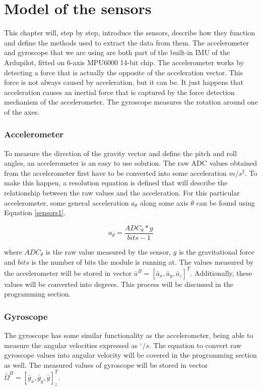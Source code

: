 \section{Model of the sensors}

This chapter will, step by step, introduce the sensors, describe how they function and define the methods used to extract the data from them. The accelerometer and gyroscope that we are using are both part of the built-in IMU of the Ardupilot, fitted on 6-axis MPU6000 14-bit chip. The accelerometer works by detecting a force that is actually the opposite of the acceleration vector. This force is not always caused by acceleration, but it can be. It just happens that acceleration causes an inertial force that is captured by the force detection mechanism of the accelerometer. The gyroscope measures the rotation around one of the axes.

\subsubsection{Accelerometer}

To measure the direction of the gravity vector and define the pitch and roll angles, an accelerometer is an easy to use solution.
The raw ADC values obtained from the accelerometer first have to be converted into some acceleration $m/s^2$. To make this happen, a resolution equation is defined that will describe the relationship between the raw values and the acceleration.
For this particular accelerometer, some general acceleration $a_\theta $ along some axis $\theta$ can be found using Equation \ref{sensors1}.

\begin{equation}
\label{sensors1}	
 	a_\theta = \frac{ADC_\theta * g}{bits-1}
\end{equation}

where $ADC_\theta $ is the raw value measured by the sensor, $g$ is the gravitational force and $bits$ is the number of bits the module is running at.
The values measured by the accelerometer will be stored in vector $\bar{a}^B = [\bar{a}_x, \bar{a}_y, \bar{a}_z]^T$. Additionally, these values will be converted into degrees. This process will be discussed in the programming section.

\subsubsection{Gyroscope}

The gyroscope has some similar functionality as the accelerometer, being able to measure the angular velocities expressed as $^{\circ}/s$. The equation to convert raw gyroscope values into angular velocity will be covered in the programming section as well. The measured values of gyroscope will be stored in vector $\bar{\Omega}^B = [\bar{g}_x, \bar{g}_y, \bar{g}]_z^T$.

